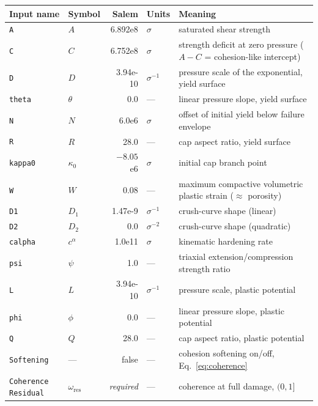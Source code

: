 \documentclass[12pt]{article}
\begin{document}
\begin{center}
\small
\begin{tabular}{llrlp{5.4cm}}
\toprule
Input name & Symbol & Salem & Units & Meaning \\
\midrule
\texttt{A}       & $A$        & 6.892e8  & $\sigma$      & saturated shear strength \\
\texttt{C}       & $C$        & 6.752e8  & $\sigma$      & strength deficit at zero pressure ($A{-}C$ = cohesion-like intercept) \\
\texttt{D}       & $D$        & 3.94e-10 & $\sigma^{-1}$ & pressure scale of the exponential, yield surface \\
\texttt{theta}   & $\theta$   & 0.0      & ---           & linear pressure slope, yield surface \\
\texttt{N}       & $N$        & 6.0e6    & $\sigma$      & offset of initial yield below failure envelope \\
\texttt{R}       & $R$        & 28.0     & ---           & cap aspect ratio, yield surface \\
\texttt{kappa0}  & $\kappa_0$ & $-8.05$e6 & $\sigma$     & initial cap branch point \\
\texttt{W}       & $W$        & 0.08     & ---           & maximum compactive volumetric plastic strain ($\approx$ porosity) \\
\texttt{D1}      & $D_1$      & 1.47e-9  & $\sigma^{-1}$ & crush-curve shape (linear) \\
\texttt{D2}      & $D_2$      & 0.0      & $\sigma^{-2}$ & crush-curve shape (quadratic) \\
\texttt{calpha}  & $c^\alpha$ & 1.0e11   & $\sigma$      & kinematic hardening rate \\
\texttt{psi}     & $\psi$     & 1.0      & ---           & triaxial extension/compression strength ratio \\
\texttt{L}       & $L$        & 3.94e-10 & $\sigma^{-1}$ & pressure scale, plastic potential \\
\texttt{phi}     & $\phi$     & 0.0      & ---           & linear pressure slope, plastic potential \\
\texttt{Q}       & $Q$        & 28.0     & ---           & cap aspect ratio, plastic potential \\
\midrule
\texttt{Softening}          & ---  & false & --- & cohesion softening on/off, Eq.~\eqref{eq:coherence} \\
\texttt{Coherence Residual} & $\omega_{\mathrm{res}}$ & \emph{required} & --- & coherence at full damage, $(0, 1]$ \\

\end{tabular}
\end{center}
\end{document}
